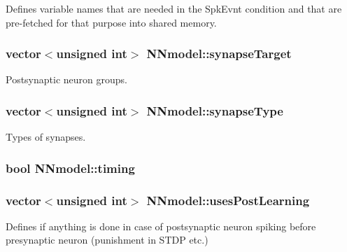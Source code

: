 Defines variable names that are needed in the Spk\+Evnt condition and that are pre-\/fetched for that purpose into shared memory. 

\hypertarget{classNNmodel_a10c4e0a9d71bbfa6895de30a64f31ca6}{
\subsubsection[{synapse\+Target}]{\setlength{\rightskip}{0pt plus 5cm}vector$<$unsigned int$>$ N\+Nmodel\+::synapse\+Target}}\label{classNNmodel_a10c4e0a9d71bbfa6895de30a64f31ca6}


Postsynaptic neuron groups. 

\hypertarget{classNNmodel_a5945dd8a2936f38a5997a5cae51cf706}{
\subsubsection[{synapse\+Type}]{\setlength{\rightskip}{0pt plus 5cm}vector$<$unsigned int$>$ N\+Nmodel\+::synapse\+Type}}\label{classNNmodel_a5945dd8a2936f38a5997a5cae51cf706}


Types of synapses. 

\hypertarget{classNNmodel_afae2a91984509205ff07afc948cbf106}{
\subsubsection[{timing}]{\setlength{\rightskip}{0pt plus 5cm}bool N\+Nmodel\+::timing}}\label{classNNmodel_afae2a91984509205ff07afc948cbf106}
\hypertarget{classNNmodel_a81fb25a9fab59e840ef622d469747d69}{
\subsubsection[{uses\+Post\+Learning}]{\setlength{\rightskip}{0pt plus 5cm}vector$<$unsigned int$>$ N\+Nmodel\+::uses\+Post\+Learning}}\label{classNNmodel_a81fb25a9fab59e840ef622d469747d69}


Defines if anything is done in case of postsynaptic neuron spiking before presynaptic neuron (punishment in S\+T\+D\+P etc.) 

